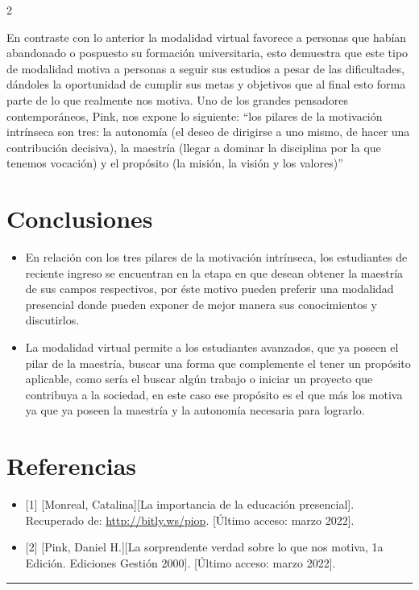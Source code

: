 \documentclass[12pt,spanish,Letterpaper,openany]{book}
\newcommand{\HRule}{\begin{center}\rule{0.5\linewidth}{0.2mm}\end{center}}
\begin{document}
\begin {multicols}{2}
\begin {flushleft}
\begin{minipage}[c]{\columnwidth}
\end{minipage}
\end {flushleft}

En contraste con lo anterior la modalidad virtual favorece a personas que habían abandonado o pospuesto su formación universitaria, esto demuestra que este tipo de modalidad motiva a personas a seguir sus estudios a pesar de las dificultades, dándoles la oportunidad de cumplir sus metas y objetivos que al final esto forma parte de lo que realmente nos motiva. Uno de los grandes pensadores contemporáneos, Pink, nos expone lo siguiente: ``los pilares de la motivación intrínseca son tres: la autonomía (el deseo de dirigirse a uno mismo, de hacer una contribución decisiva), la maestría (llegar a dominar la disciplina por la que tenemos vocación) y el propósito (la misión, la visión y los valores)''

\hypertarget{conclusiones-9}{%
\section{Conclusiones}\label{conclusiones-9}}

\begin{itemize}
\item
  En relación con los tres pilares de la motivación intrínseca, los estudiantes de reciente ingreso se encuentran en la etapa en que desean obtener la maestría de sus campos respectivos, por éste motivo pueden preferir una modalidad presencial donde pueden exponer de mejor manera sus conocimientos y discutirlos.
\item
  La modalidad virtual permite a los estudiantes avanzados, que ya poseen el pilar de la maestría, buscar una forma que complemente el tener un propósito aplicable, como sería el buscar algún trabajo o iniciar un proyecto que contribuya a la sociedad, en este caso ese propósito es el que más los motiva ya que ya poseen la maestría y la autonomía necesaria para lograrlo.
\end{itemize}

\hypertarget{referencias-14}{%
\section*{Referencias}\label{referencias-14}}

\begin{itemize}
\item
  {[}1{]} {[}Monreal, Catalina{]}{[}La importancia de la educación presencial{]}. Recuperado de: \url{http://bitly.ws/piop}. {[}Último acceso: marzo 2022{]}.
\item
  {[}2{]} {[}Pink, Daniel H.{]}{[}La sorprendente verdad sobre lo que nos motiva, 1a Edición. Ediciones Gestión 2000{]}. {[}Último acceso: marzo 2022{]}.
\end{itemize}

\end {multicols}
\medskip
\HRule
\medskip
\end{document}
